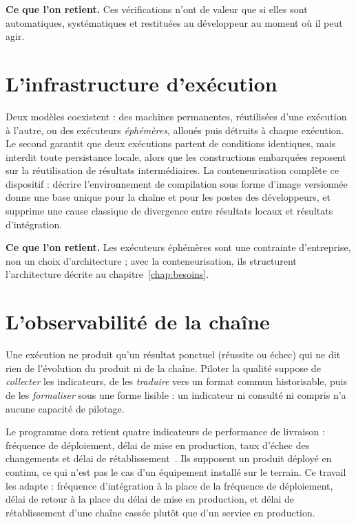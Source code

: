 \textbf{Ce que l'on retient.} Ces vérifications n'ont de valeur que si elles
sont automatiques, systématiques et restituées au développeur au moment où il
peut agir.

\section{L'infrastructure d'exécution}
\label{sec:art-infra}

Deux modèles coexistent : des machines permanentes, réutilisées d'une exécution
à l'autre, ou des exécuteurs \emph{éphémères}, alloués puis détruits à chaque
exécution. Le second garantit que deux exécutions partent de conditions
identiques, mais interdit toute persistance locale, alors que les constructions
embarquées reposent sur la réutilisation de résultats intermédiaires. La
conteneurisation complète ce dispositif : décrire l'environnement de compilation
sous forme d'image versionnée donne une base unique pour la chaîne et pour les
postes des développeurs, et supprime une cause classique de divergence entre
résultats locaux et résultats d'intégration.

\textbf{Ce que l'on retient.} Les exécuteurs éphémères sont une contrainte
d'entreprise, non un choix d'architecture ; avec la conteneurisation, ils
structurent l'architecture décrite au chapitre~\ref{chap:besoins}.

\section{L'observabilité de la chaîne}
\label{sec:art-observabilite}

Une exécution ne produit qu'un résultat ponctuel (réussite ou échec) qui ne dit
rien de l'évolution du produit ni de la chaîne. Piloter la qualité suppose de
\emph{collecter} les indicateurs, de les \emph{traduire} vers un format commun
historisable, puis de les \emph{formaliser} sous une forme lisible : un
indicateur ni consulté ni compris n'a aucune capacité de pilotage.

\label{sec:art-dora}
Le programme \gls{dora} retient quatre indicateurs de performance de livraison :
fréquence de déploiement, délai de mise en production, taux d'échec des
changements et délai de rétablissement~\cite{forsgren2018accelerate}. Ils
supposent un produit déployé en continu, ce qui n'est pas le cas d'un
équipement installé sur le terrain. Ce travail les adapte : fréquence
d'intégration à la place de la fréquence de déploiement, délai de retour à la
place du délai de mise en production, et délai de rétablissement d'une chaîne
cassée plutôt que d'un service en production.

